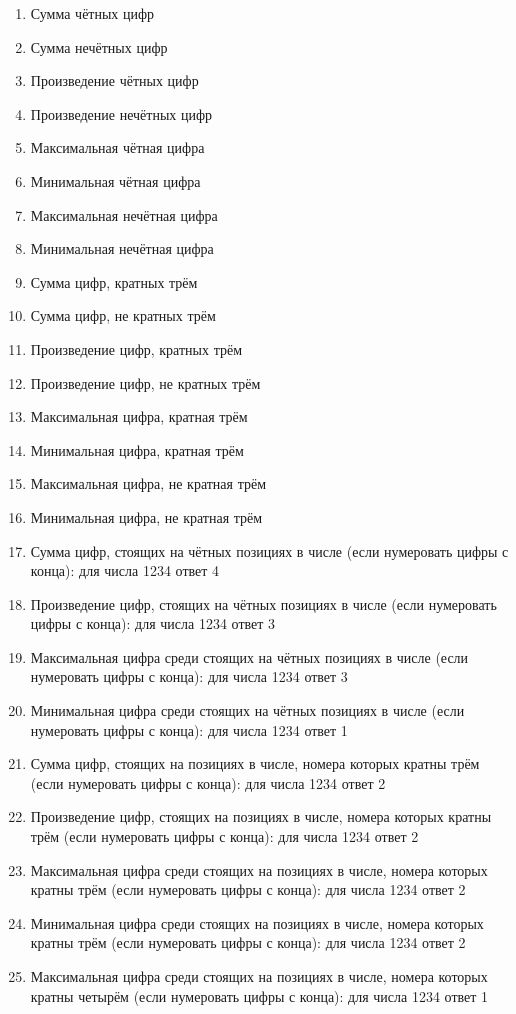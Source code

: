 \begin{enumerate}
\item Сумма чётных цифр
\item Сумма нечётных цифр
\item Произведение чётных цифр
\item Произведение нечётных цифр
\item Максимальная чётная цифра
\item Минимальная чётная цифра
\item Максимальная нечётная цифра
\item Минимальная нечётная цифра
\item Сумма цифр, кратных трём
\item Сумма цифр, не кратных трём
\item Произведение цифр, кратных трём
\item Произведение цифр, не кратных трём
\item Максимальная цифра, кратная трём
\item Минимальная цифра, кратная трём
\item Максимальная цифра, не кратная трём
\item Минимальная цифра, не кратная трём
\item Сумма цифр, стоящих на чётных позициях в числе (если нумеровать цифры с конца): для числа 1234 ответ 4
\item Произведение цифр, стоящих на чётных позициях в числе (если нумеровать цифры с конца): для числа 1234 ответ 3
\item Максимальная цифра среди стоящих на чётных позициях в числе (если нумеровать цифры с конца): для числа 1234 ответ 3
\item Минимальная цифра среди стоящих на чётных позициях в числе (если нумеровать цифры с конца): для числа 1234 ответ 1
\item Сумма цифр, стоящих на позициях в числе, номера которых кратны трём (если нумеровать цифры с конца): для числа 1234 ответ 2
\item Произведение цифр, стоящих на позициях в числе, номера которых кратны трём (если нумеровать цифры с конца): для числа 1234 ответ 2
\item Максимальная цифра среди стоящих на позициях в числе, номера которых кратны трём (если нумеровать цифры с конца): для числа 1234 ответ 2
\item Минимальная цифра среди стоящих на позициях в числе, номера которых кратны трём (если нумеровать цифры с конца): для числа 1234 ответ 2
\item Максимальная цифра среди стоящих на позициях в числе, номера которых кратны четырём (если нумеровать цифры с конца): для числа 1234 ответ 1
\end{enumerate}

